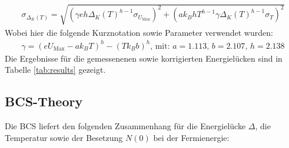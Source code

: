 \documentclass[twoside,        %
               BCOR12mm,       %
               english,ngerman, %
               fleqn,headsepline=false,footsepline=false
              ]{MFPREPORT}
\begin{document}
\begin{align}
\sigma_{\Delta_{K} (T)} =
\sqrt{          
(\gamma e h\Delta_{K}(T)^{h-1} \sigma_{U_{\text{Max}}} )^2 +
(a k_{B} h T^{h-1} \gamma \Delta_{K}(T)^{h-1} \sigma_{T}  )^2
}
\label{eq:korrformel}
\end{align}
Wobei hier die folgende Kurznotation sowie Parameter verwendet wurden:
\begin{align}
\gamma = (e U_{\text{Max}} - a k_{B} T)^h - (T k_{B} b)^h
\text{, mit: }
a= 1.113 \text{, }
b= 2.107 \text{, }
h=2.138
\label{eq:fehlerkor}
\end{align}
Die Ergebnisse für die gemessenenen sowie korrigierten Energielücken sind in Tabelle \ref{tab:results} gezeigt.





\subsection{BCS-Theory}
Die BCS liefert den folgenden Zusammenhang für die Energielücke $\Delta$, die Temperatur sowie der Besetzung $N(0)$ bei der Fermienergie:
\end{document}
